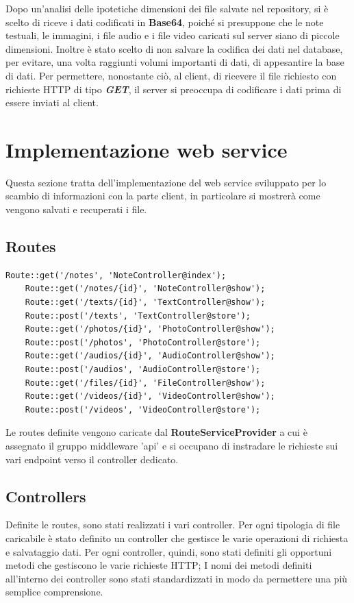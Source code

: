 Dopo un'analisi delle ipotetiche dimensioni dei file salvate nel repository, si è scelto di riceve i dati codificati in \textbf{Base64}, poiché si presuppone che le note testuali, le immagini, i file audio e i file video caricati sul server siano di piccole dimensioni.
Inoltre è stato scelto di non salvare la codifica dei dati nel database, per evitare, una volta raggiunti volumi importanti di dati, di appesantire la base di dati.
Per permettere, nonostante ciò, al client, di ricevere il file richiesto con richieste HTTP di tipo \textit{\textbf{GET}}, il server si preoccupa di codificare i dati prima di essere inviati al client.

\pagebreak
\section{Implementazione web service}

Questa sezione tratta dell'implementazione del web service sviluppato per lo scambio di informazioni con la parte client, in particolare si mostrerà come vengono salvati e recuperati i file.

\subsection{Routes}

\begin{lstlisting}[caption={Definizione routes}]
	Route::get('/notes', 'NoteController@index');
	Route::get('/notes/{id}', 'NoteController@show');
	Route::get('/texts/{id}', 'TextController@show');
	Route::post('/texts', 'TextController@store');
	Route::get('/photos/{id}', 'PhotoController@show');
	Route::post('/photos', 'PhotoController@store');
	Route::get('/audios/{id}', 'AudioController@show');
	Route::post('/audios', 'AudioController@store');
	Route::get('/files/{id}', 'FileController@show');
	Route::get('/videos/{id}', 'VideoController@show');
	Route::post('/videos', 'VideoController@store');
\end{lstlisting}

Le routes definite vengono caricate dal \textbf{RouteServiceProvider} a cui è assegnato il gruppo middleware 'api' e si occupano di instradare le richieste sui vari endpoint verso il controller dedicato.

\subsection{Controllers}

Definite le routes, sono stati realizzati i vari controller. Per ogni tipologia di file caricabile è stato definito un controller che gestisce le varie operazioni di richiesta e salvataggio dati.
Per ogni controller, quindi, sono stati definiti gli opportuni metodi che gestiscono le varie richieste HTTP;
I nomi dei metodi definiti all'interno dei controller sono stati standardizzati in modo da permettere una più semplice comprensione.

